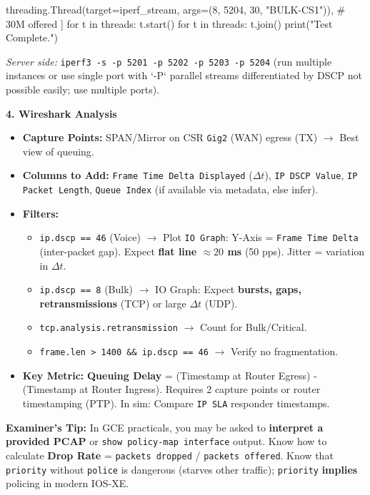 \documentclass[11pt]{article}
\begin{document}
\begin{exoresolu}
\begin{flushleft}
{    threading.Thread(target=iperf\_stream, args=(8,  5204, 30, "BULK-CS1")),      \# 30M offered\newline
]\newline
for t in threads: t.start()\newline
for t in threads: t.join()\newline
print("Test Complete.")\newline
}
\end{flushleft}
\textit{Server side:} \texttt{iperf3 -s -p 5201 -p 5202 -p 5203 -p 5204} (run multiple instances or use single port with `-P` parallel streams differentiated by DSCP not possible easily; use multiple ports).

\noindent\textbf{4. Wireshark Analysis}
\begin{itemize}
    \item \textbf{Capture Points:} SPAN/Mirror on CSR \texttt{Gig2} (WAN) egress (TX) $\rightarrow$ Best view of queuing.
    \item \textbf{Columns to Add:} \texttt{Frame Time Delta Displayed} ($\Delta t$), \texttt{IP DSCP Value}, \texttt{IP Packet Length}, \texttt{Queue Index} (if available via metadata, else infer).
    \item \textbf{Filters:}
    \begin{itemize}
        \item \texttt{ip.dscp == 46} (Voice) $\rightarrow$ Plot \texttt{IO Graph}: Y-Axis = \texttt{Frame Time Delta} (inter-packet gap). Expect \textbf{flat line $\approx 20$ ms} (50 pps). Jitter = variation in $\Delta t$.
        \item \texttt{ip.dscp == 8} (Bulk) $\rightarrow$ IO Graph: Expect \textbf{bursts, gaps, retransmissions} (TCP) or large $\Delta t$ (UDP).
        \item \texttt{tcp.analysis.retransmission} $\rightarrow$ Count for Bulk/Critical.
        \item \texttt{frame.len > 1400 \&\& ip.dscp == 46} $\rightarrow$ Verify no fragmentation.
    \end{itemize}
    \item \textbf{Key Metric:} \textbf{Queuing Delay} = (Timestamp at Router Egress) - (Timestamp at Router Ingress). Requires 2 capture points or router timestamping (PTP). In sim: Compare \texttt{IP SLA} responder timestamps.
\end{itemize}

\noindent\textbf{Examiner's Tip:} In GCE practicals, you may be asked to \textbf{interpret a provided PCAP} or \texttt{show policy-map interface} output. Know how to calculate \textbf{Drop Rate} = \texttt{packets dropped} / \texttt{packets offered}. Know that \texttt{priority} without \texttt{police} is dangerous (starves other traffic); \texttt{priority} \textbf{implies} policing in modern IOS-XE.
\end{exoresolu}
\end{document}

